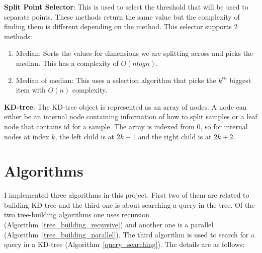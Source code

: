 \documentclass[11pt]{amsart}
\begin{document}
\begin{list}{}{\leftmargin= 1.4cm}
\item \textbf{Split Point Selector}: This is used to select the threshold that will be used to separate points. These methods return the same value but the complexity of finding them is different depending on the method. This selector supports 2 methods:
\vspace{1.5 mm}
\begin{enumerate}\setlength\itemsep{0.5em}
\item Median: Sorts the values for dimensions we are splitting across and picks the median. This has a complexity of $O(nlogn)$. 
\item Median \-of \-median: This uses a selection algorithm that picks the $k^{th}$ biggest item with $O(n)$ complexity.
\end{enumerate}

\item \textbf{KD-tree}: The KD-tree object is represented as an array of nodes. A node can either be an  internal node containing information of how to split samples or a leaf node that contains id for a sample. The array is indexed from 0, so for internal nodes at index $k$, the left child is at $2k + 1$ and the right child is at $2k + 2$.

\end{list}

\section{Algorithms}
\label{sec:algorithms}
I implemented three algorithms in this project. First two of them are related to building KD-tree and the third one is about searching a query in the tree. Of the two tree-building algorithms one uses recursion (Algorithm~\ref{tree_building_recursive}) and another one is a parallel (Algorithm~\ref{tree_building_parallel}). The third algorithm is used to search for a query in a KD-tree (Algorithm~\ref{query_searching}). The details are as follows:
\end{document}
